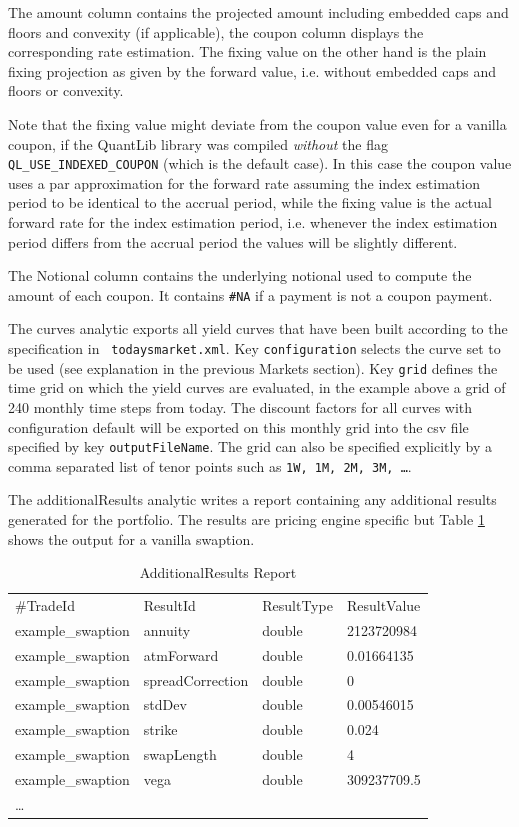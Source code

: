 \documentclass[12pt, a4paper]{article}
\begin{document}
The amount column contains the projected amount including embedded caps and floors and convexity (if applicable), the
coupon column displays the corresponding rate estimation. The fixing value on the other hand is the plain fixing
projection as given by the forward value, i.e. without embedded caps and floors or convexity.

Note that the fixing value might deviate from the coupon value even for a vanilla coupon, if the QuantLib library was
compiled {\em without} the flag \verb+QL_USE_INDEXED_COUPON+ (which is the default case). In this case the coupon value
uses a par approximation for the forward rate assuming the index estimation period to be identical to the accrual
period, while the fixing value is the actual forward rate for the index estimation period, i.e. whenever the index estimation
period differs from the accrual period the values will be slightly different.

The Notional column contains the underlying notional used to compute the amount of each coupon. It contains \verb+#NA+
if a payment is not a coupon payment.

The curves analytic exports all yield curves that have been built according to the specification in {\tt
  todaysmarket.xml}. Key {\tt configuration} selects the curve set to be used (see explanation in the previous Markets
section).  Key {\tt grid} defines the time grid on which the yield curves are evaluated, in the example above a grid of
240 monthly time steps from today. The discount factors for all curves with configuration default will be exported on
this monthly grid into the csv file specified by key {\tt outputFileName}. The grid can also be specified explicitly by
a comma separated list of tenor points such as {\tt 1W, 1M, 2M, 3M, \dots}.

The additionalResults analytic writes a report containing any additional results generated for the portfolio. The results are pricing engine specific but Table \ref{additionalreport} shows the output for a vanilla swaption.

\begin{table}[hbt]
\scriptsize
\begin{center}
  \begin{tabular}{l|l|l|l}
\hline
\#TradeId & ResultId & ResultType & ResultValue \\
example\_swaption & annuity & double & 2123720984 \\
example\_swaption & atmForward & double & 0.01664135 \\
example\_swaption & spreadCorrection & double & 0 \\
example\_swaption & stdDev & double & 0.00546015 \\
example\_swaption & strike & double & 0.024 \\
example\_swaption & swapLength & double & 4 \\
example\_swaption & vega & double & 309237709.5 \\
\hline
\hline
\ldots
\end{tabular}
\caption{AdditionalResults Report}
\label{additionalreport}
\end{center}
\end{table}
\end{document}
